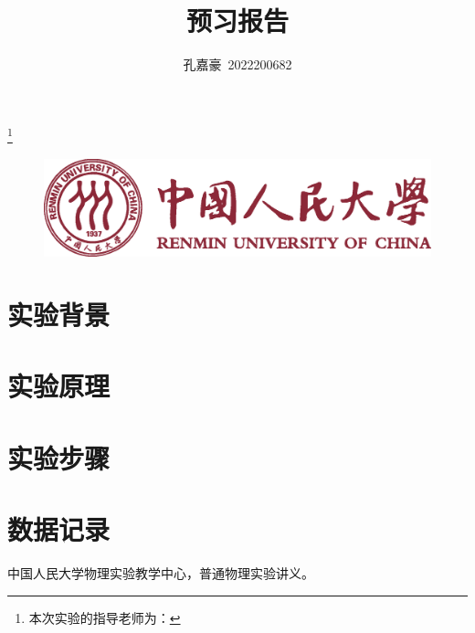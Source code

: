 \documentclass[aps,twocolumn,prl,amsmath,amssymb,floatfix,superscriptaddress]{revtex4-1}
\begin{document}
\title{\LARGE 预习报告}
\author{孔嘉豪\ 2022200682}
\thanks{本次实验的指导老师为：}
\begin{figure}
  \centering
  \includegraphics[width=0.8\linewidth]{Renmin_Univ_Logo.eps}
\end{figure}
\maketitle
\onecolumngrid
\setcounter{figure}{0}
\renewcommand{\thefigure}{S\arabic{figure}}

\section{实验背景}
\lipsum[1]
\section{实验原理}
\lipsum
\section{实验步骤}
\lipsum

\section{数据记录}
\lipsum


\begin{thebibliography}{10}
   中国人民大学物理实验教学中心，普通物理实验讲义。
\end{thebibliography}
\end{document}
